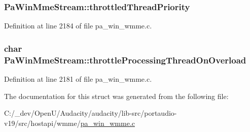 \subsubsection[{\texorpdfstring{throttled\+Thread\+Priority}{throttledThreadPriority}}]{ Pa\+Win\+Mme\+Stream\+::throttled\+Thread\+Priority}\hypertarget{struct_pa_win_mme_stream_a378da5fecc2e6243bb9e2734a7abbc55}{}\label{struct_pa_win_mme_stream_a378da5fecc2e6243bb9e2734a7abbc55}


Definition at line 2184 of file pa\+\_\+win\+\_\+wmme.\+c.

\subsubsection[{\texorpdfstring{throttle\+Processing\+Thread\+On\+Overload}{throttleProcessingThreadOnOverload}}]{\setlength{\rightskip}{0pt plus 5cm}char Pa\+Win\+Mme\+Stream\+::throttle\+Processing\+Thread\+On\+Overload}\hypertarget{struct_pa_win_mme_stream_aa8a3358086a7b8f651d60b0d985e67b1}{}\label{struct_pa_win_mme_stream_aa8a3358086a7b8f651d60b0d985e67b1}


Definition at line 2181 of file pa\+\_\+win\+\_\+wmme.\+c.



The documentation for this struct was generated from the following file\+:\begin{DoxyCompactItemize}
\item 
C\+:/\+\_\+dev/\+Open\+U/\+Audacity/audacity/lib-\/src/portaudio-\/v19/src/hostapi/wmme/\hyperlink{pa__win__wmme_8c}{pa\+\_\+win\+\_\+wmme.\+c}\end{DoxyCompactItemize}
